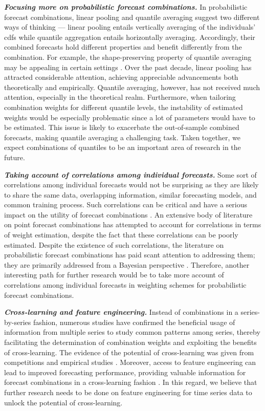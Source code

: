 \documentclass[11pt]{article}
\begin{document}
\textbf{\textit{Focusing more on probabilistic forecast combinations.}} In probabilistic forecast combinations, linear pooling and quantile averaging suggest two different ways of thinking --- linear pooling entails vertically averaging of the individuals' cdfs while quantile aggregation entails horizontally averaging. Accordingly, their combined forecasts hold different properties and benefit differently from the combination. For example, the shape-preserving property of quantile averaging may be appealing in certain settings \citep{Lichtendahl2013-rt}. Over the past decade, linear pooling has attracted considerable attention, achieving appreciable advancements both theoretically and empirically. Quantile averaging, however, has not received much attention, especially in the theoretical realm. Furthermore, when tailoring combination weights for different quantile levels, the instability of estimated weights would be especially problematic since a lot of parameters would have to be estimated. This issue is likely to exacerbate the out-of-sample combined forecasts, making quantile averaging a challenging task. Taken together, we expect combinations of quantiles to be an important area of research in the future.

\textbf{\textit{Taking account of correlations among individual forecasts.}} Some sort of correlations among individual forecasts would not be surprising as they are likely to share the same data, overlapping information, similar forecasting models, and common training process. Such correlations can be critical and have a serious impact on the utility of forecast combinations \citep{De_Menezes2000-vd}. An extensive body of literature on point forecast combinations has attempted to account for correlations in terms of weight estimation, despite the fact that these correlations can be poorly estimated. Despite the existence of such correlations, the literature on probabilistic forecast combinations has paid scant attention to addressing them; they are primarily addressed from a Bayesian perspective \citep[e.g.,][]{Winkler1981-bn,McAlinn2019-kn}. Therefore, another interesting path for further research would be to take more account of correlations among individual forecasts in weighting schemes for probabilistic forecast combinations.

\textbf{\textit{Cross-learning and feature engineering.}} Instead of combinations in a series-by-series fashion, numerous studies have confirmed the beneficial usage of information from multiple series to study common patterns among series, thereby facilitating the determination of combination weights and exploiting the benefits of cross-learning. The evidence of the potential of cross-learning was given from competitions \citep[e.g.,][]{Makridakis2020-hu,Makridakis2020-fn} and empirical studies \citep[e.g.,][]{Ma2021-np}. Moreover, access to feature engineering can lead to improved forecasting performance, providing valuable information for forecast combinations in a cross-learning fashion \citep{Montero-Manso2020-tq,Kang2021-ol}. In this regard, we believe that further research needs to be done on feature engineering for time series data to unlock the potential of cross-learning.
\end{document}

